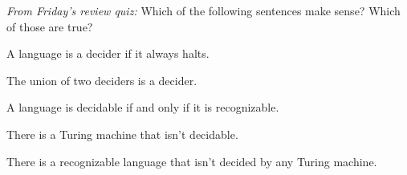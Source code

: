 
{\it From Friday's review quiz: }
Which of the following sentences make sense? Which of those are true?

A language is a decider if it always halts.

\vfill

The union of two deciders is a decider.

\vfill

A language is decidable if and only if it is recognizable.

\vfill

There is a Turing machine that isn't decidable.

\vfill

There is a recognizable language that isn't decided by any Turing machine.

\vfill

\newpage
